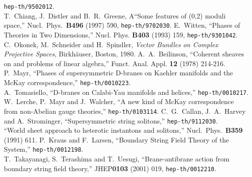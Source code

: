 \documentclass[a4paper,12pt]{article}
\begin{document}
\begin{thebibliography}{99}
{\tt hep-th/9502012}. \\
T.~Chiang, J.~Distler and B.~R.~Greene,
A``Some features of (0,2) moduli space,'' Nucl.\ Phys.\ {\bf B496}
(1997)
590, {\tt hep-th/9702030}.
E.~Witten, ``Phases of \coordHE{} Theories in Two Dimensions,''
Nucl. Phys. {\bf B403} (1993) 159, {\tt hep-th/9301042}.
 C.~Okonek, M.~Schneider and H.~Spindler, {\em Vector
Bundles on Complex Projective Spaces}, Birkh\"auser, Boston, 1980.
A.~A.~Beilinson, ``Coherent sheaves on \coordHE{} and
problems of linear algebra,'' Funct. Anal. Appl. {\bf 12}
(1978) 214-216.
 P.~Mayr, 
``Phases of supersymmetric D-branes on Kaehler manifolds and the McKay
correspondence,'' {\tt hep-th/0010223}. \\
A.~Tomasiello, ``D-branes on Calabi-Yau manifolds and helices,''
{\tt hep-th/0010217}.\\      
W.~Lerche, P.~Mayr and J.~Walcher,
``A new kind of McKay correspondence from non-Abelian gauge theories,''
{\tt hep-th/0103114}.
C.~G.~Callan, J.~A.~Harvey and A.~Strominger,
``Supersymmetric string solitons,''
{\tt hep-th/9112030}. \\
``World sheet approach to heterotic instantons and solitons,''
Nucl.\ Phys.\ {\bf B359} (1991) 611.
P.~Kraus and F.~Larsen,
``Boundary String Field Theory of the \coordHE{} System,''
{\tt hep-th/0012198}. \\
T.~Takayanagi, S.~Terashima and T.~Uesugi,
``Brane-antibrane action from boundary string field theory,''
JHEP{\bf 0103} (2001) 019,
{\tt hep-th/0012210}.
\end{thebibliography}
\end{document}
